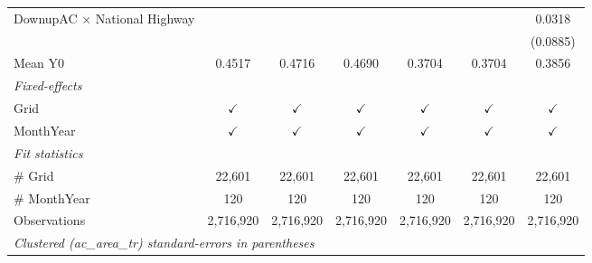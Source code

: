 \begin{table}[htbp]
\begin{tabular}{lcccccc}
      DownupAC $\times$ National Highway                         &               &               &               &               &               & 0.0318\\   
                                                                 &               &               &               &               &               & (0.0885)\\   
      \hline Mean Y0                                             & 0.4517        & 0.4716        & 0.4690        & 0.3704        & 0.3704        & 0.3856\\  
      \midrule
      \emph{Fixed-effects}\\
      Grid                                                       & $\checkmark$  & $\checkmark$  & $\checkmark$  & $\checkmark$  & $\checkmark$  & $\checkmark$\\   
      MonthYear                                                  & $\checkmark$  & $\checkmark$  & $\checkmark$  & $\checkmark$  & $\checkmark$  & $\checkmark$\\   
      \midrule
      \emph{Fit statistics}\\
      \# Grid                                                    & 22,601        & 22,601        & 22,601        & 22,601        & 22,601        & 22,601\\  
      \# MonthYear                                               & 120           & 120           & 120           & 120           & 120           & 120\\  
      Observations                                               & 2,716,920     & 2,716,920     & 2,716,920     & 2,716,920     & 2,716,920     & 2,716,920\\  
      \midrule \midrule
      \multicolumn{7}{l}{\emph{Clustered (ac\_area\_tr) standard-errors in parentheses}}\\
   \end{tabular}
\end{table}


